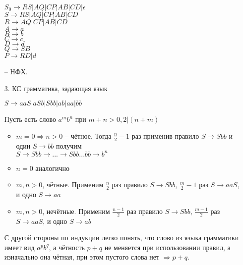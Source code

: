 \documentclass[12pt]{article}
\begin{document}
\begin{enumerate}
\begin{myquote}
$S_0 \to RS|AQ|CP|AB|CD|\epsilon$\\
$S \to RS|AQ|CP|AB|CD$\\
$R \to AQ|CP|AB|CD$\\
$A \to a$\\
$B \to b$\\
$C \to c$\\
$D \to d$\\
$Q \to SB$\\
$P \to RD|d$
\end{myquote} -- НФХ.
\item[3.] КС грамматика, задающая язык
\begin{myquote}
$S \to aaS|aSb|Sbb|ab|aa|bb$
\end{myquote}
Пусть есть слово $a^mb^n$ при $m+n>0, 2|(n+m)$
\begin{itemize}
\item $m = 0 \Rightarrow n>0$ -- чётное. Тогда $\frac{n}{2} - 1$ раз применив правило $S \to Sbb$ и один $S \to bb$ получим\\
$S \to Sbb \to ... \to Sbb...bb \to b^n$ 
\item $n=0$ аналогично
\item $m, n > 0$, чётные. Применим $\frac{n}{2}$ раз правило $S \to Sbb$,  $\frac{m}{2}-1$ раз $S \to aaS$, и одно $S \to aa$
\item  $m, n > 0$, нечётные. Применим $\frac{n-1}{2}$ раз правило $S \to Sbb$,  $\frac{m-1}{2}$ раз $S \to aaS$, и одно $S \to ab$
\end{itemize}
С другой стороны по индукции легко понять, что слово из языка грамматики имеет вид $a^pb^q$, а чётность $p+q$ не меняется при использовании правил, а изначально она чётная, при этом пустого слова нет $\Rightarrow p+q$.
 \end{enumerate}
\end{document}
